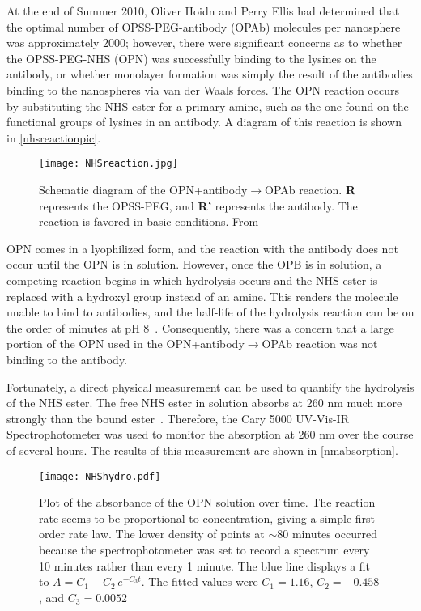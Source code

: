 At the end of Summer 2010, Oliver Hoidn and Perry Ellis had determined that the optimal number of OPSS-PEG-antibody (OPAb) molecules per nanosphere was approximately 2000; however, there were significant concerns as to whether the OPSS-PEG-NHS (OPN) was successfully binding to the lysines on the antibody, or whether monolayer formation was simply the result of the antibodies binding to the nanospheres via van der Waals forces. The OPN reaction occurs by substituting the NHS ester for a primary amine, such as the one found on the functional groups of lysines in an antibody. A diagram of this reaction is shown in \autoref{nhsreactionpic}.

\begin{figure}[htbp]
\centering
\texttt{[image: NHSreaction.jpg]}
\caption{Schematic diagram of the OPN+antibody$\to$OPAb reaction. \textbf{R} represents the OPSS-PEG, and \textbf{R'} represents the antibody. The reaction is favored in basic conditions. From ~\citep{nhsreaction}}
\label{nhsreactionpic}
\end{figure}



OPN comes in a lyophilized form, and the reaction with the antibody does not occur until the OPN is in solution. However, once the OPB is in solution, a competing reaction begins in which hydrolysis occurs and the NHS ester is replaced with a hydroxyl group instead of an amine. This renders the molecule unable to bind to antibodies, and the half-life of the hydrolysis reaction can be on the order of minutes at pH 8~\citep{nhshalflife}. Consequently, there was a concern that a large portion of the OPN used in the OPN+antibody$\to$OPAb reaction was not binding to the antibody.

Fortunately, a direct physical measurement can be used to quantify the hydrolysis of the NHS ester. The free NHS ester in solution absorbs at 260 nm much more strongly than the bound ester~\citep{Miron_Wilchek_1982}. Therefore, the Cary 5000 UV-Vis-IR Spectrophotometer was used to monitor the absorption at 260 nm over the course of several hours. The results of this measurement are shown in \autoref{nmabsorption}.

\begin{figure}[htbp]
\centering
\texttt{[image: NHShydro.pdf]}
\caption{Plot of the absorbance of the OPN solution over time. The reaction rate seems to be proportional to concentration, giving a simple first-order rate law. The lower density of points at \ensuremath{\sim}80 minutes occurred because the spectrophotometer was set to record a spectrum every 10 minutes rather than every 1 minute. The blue line displays a fit to $A = C_1 + C_2\, e^{-C_3 t}$. The fitted values were $C_1=1.16$, $C_2=-0.458$, and $C_3=0.0052$}
\label{nmabsorption}
\end{figure}



